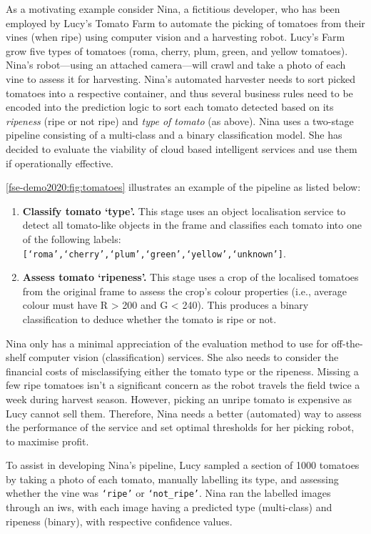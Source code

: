 As a motivating example consider Nina, a fictitious developer, who has been employed by Lucy's Tomato Farm to automate the picking of tomatoes from their vines (when ripe) using computer vision and a harvesting robot. Lucy's Farm grow five types of tomatoes (roma, cherry, plum, green, and yellow tomatoes). Nina's robot---using an attached camera---will crawl and take a photo of each vine to assess it for harvesting.
Nina's automated harvester needs to sort picked tomatoes into a respective container, and thus several business rules need to be encoded into the prediction logic to sort each tomato detected based on its \textit{ripeness} (ripe or not ripe) and \textit{type of tomato} (as above).
Nina uses a two-stage pipeline consisting of a multi-class and a binary classification model. She has decided to evaluate the viability of cloud based intelligent services and use them if operationally effective.

\cref{fse-demo2020:fig:tomatoes} illustrates an example of the pipeline as listed below:

\begin{enumerate}
    \item \textbf{Classify tomato `type'.} This stage uses an object localisation service to detect all tomato-like objects in the frame and classifies each tomato into one of the following labels: \texttt{[`roma',`cherry',`plum',`green',`yellow',`unknown']}.
    \item \textbf{Assess tomato `ripeness'.} This stage uses a crop of the localised tomatoes from the original frame to assess the crop's colour properties (i.e., average colour must have R > 200 and G < 240). This produces a binary classification to deduce whether the tomato is ripe or not.
\end{enumerate}

Nina only has a minimal appreciation of the evaluation method to use for off-the-shelf computer vision (classification) services. She also needs to consider the financial costs of misclassifying either the tomato type or the ripeness. Missing a few ripe tomatoes isn't a significant concern as the robot travels the field twice a week during harvest season. However, picking an unripe tomato is expensive as Lucy cannot sell them. Therefore, Nina needs a better (automated) way to assess the performance of the service and set optimal thresholds for her picking robot, to maximise profit.

To assist in developing Nina's pipeline, Lucy sampled a section of 1000 tomatoes by taking a photo of each tomato, manually labelling its type, and assessing whether the vine was  \texttt{`ripe'} or \texttt{`not\_ripe'}. Nina ran the labelled images through an \gls{iws}, with each image having a predicted type (multi-class) and ripeness (binary), with respective confidence values. 

